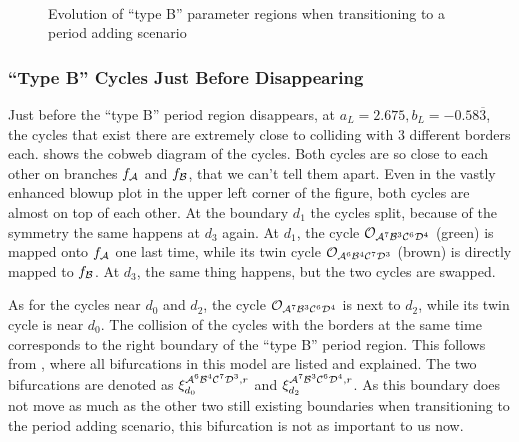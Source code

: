 \begin{figure}
    \centering
     \\
    \caption{Evolution of ``type B'' parameter regions when transitioning to a period adding scenario}
    \label{fig:minrep.path.to.disappearance}
\end{figure}

\subsubsection{``Type B'' Cycles Just Before Disappearing}

Just before the ``type B'' period region disappears, at $a_L = 2.675, b_L = -0.58\overline{3}$, the cycles that exist there are extremely close to colliding with 3 different borders each.
 shows the cobweb diagram of the cycles.
Both cycles are so close to each other on branches $f_{\mathcal{A}}$ and $f_{\mathcal{B}}$, that we can't tell them apart.
Even in the vastly enhanced blowup plot in the upper left corner of the figure, both cycles are almost on top of each other.
At the boundary $d_1$ the cycles split, because of the symmetry the same happens at $d_3$ again.
At $d_1$, the cycle $\mathcal{O}_{\mathcal{A}^7\mathcal{B}^3\mathcal{C}^6\mathcal{D}^4}$ (green) is mapped onto $f_{\mathcal{A}}$ one last time, while its twin cycle $\mathcal{O}_{\mathcal{A}^6\mathcal{B}^4\mathcal{C}^7\mathcal{D}^3}$ (brown) is directly mapped to $f_{\mathcal{B}}$.
At $d_3$, the same thing happens, but the two cycles are swapped.

As for the cycles near $d_0$ and $d_2$, the cycle $\mathcal{O}_{\mathcal{A}^7\mathcal{B}^3\mathcal{C}^6\mathcal{D}^4}$ is next to $d_2$, while its twin cycle is near $d_0$.
The collision of the cycles with the borders at the same time corresponds to the right boundary of the ``type B'' period region.
This follows from , where all bifurcations in this model are listed and explained.
The two bifurcations are denoted as $\xi_{d_0}^{\mathcal{A}^6\mathcal{B}^4\mathcal{C}^7\mathcal{D}^3, r}$ and $\xi_{d_2}^{\mathcal{A}^7\mathcal{B}^3\mathcal{C}^6\mathcal{D}^4, r}$.
As this boundary does not move as much as the other two still existing boundaries when transitioning to the period adding scenario, this bifurcation is not as important to us now.

